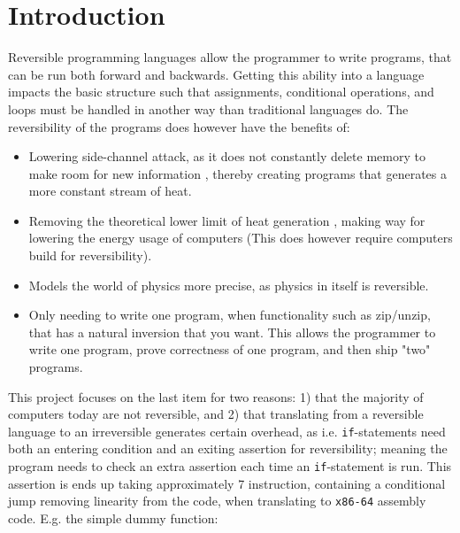 
\section{Introduction }
Reversible programming languages allow the programmer to write programs, that can be run
both forward and backwards. Getting this ability into a language impacts the basic structure
such that assignments, conditional operations, and loops must be handled in another way
than traditional languages do. The reversibility of the programs does however have the benefits
of:

\begin{itemize}
    \item Lowering side-channel attack, as it does not constantly delete memory to make room for
    new information \cite{hermes}, thereby creating programs that generates a more constant
    stream of heat.

    \item Removing the theoretical lower limit of heat generation \cite{article:3}, making way
    for lowering the energy usage of computers (This does however require computers build
    for reversibility).

    \item Models the world of physics more precise, as physics in itself is reversible.

    \item Only needing to write one program, when functionality such as zip/unzip, that has
    a natural inversion that you want. This allows the programmer to write one program, prove
    correctness of one program, and then ship "two" programs.
\end{itemize}
\noindent
This project focuses on the last item for two reasons: 1) that the majority of computers today are
not reversible, and 2) that translating from a reversible language to an irreversible
generates certain overhead, as i.e. \texttt{if}-statements need both an entering condition and an
exiting assertion for reversibility; meaning the program needs to check an extra assertion each
time an \texttt{if}-statement is run. This assertion is ends up taking approximately 7 instruction,
containing a conditional jump removing linearity from the code, when translating to
\texttt{x86-64} assembly code. E.g. the simple dummy function:

